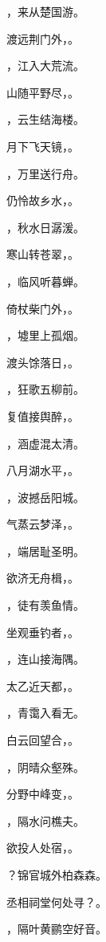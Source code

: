 \documentclass[12pt, a4paper, addpoints]{exam}
\begin{document}
\begin{questions}
\question[3] \fillin，来从楚国游。

\question[3] 渡远荆门外，\fillin。

\question[3] \fillin，江入大荒流。

\question[3] 山随平野尽，\fillin。

\question[3] \fillin，云生结海楼。

\question[3] 月下飞天镜，\fillin。

\question[3] \fillin，万里送行舟。

\question[3] 仍怜故乡水，\fillin。

\question[3] \fillin，秋水日潺湲。

\question[3] 寒山转苍翠，\fillin。

\question[3] \fillin，临风听暮蝉。

\question[3] 倚杖柴门外，\fillin。

\question[3] \fillin，墟里上孤烟。

\question[3] 渡头馀落日，\fillin。

\question[3] \fillin，狂歌五柳前。

\question[3] 复值接舆醉，\fillin。

\question[3] \fillin，涵虚混太清。

\question[3] 八月湖水平，\fillin。

\question[3] \fillin，波撼岳阳城。

\question[3] 气蒸云梦泽，\fillin。

\question[3] \fillin，端居耻圣明。

\question[3] 欲济无舟楫，\fillin。

\question[3] \fillin，徒有羡鱼情。

\question[3] 坐观垂钓者，\fillin。

\question[3] \fillin，连山接海隅。

\question[3] 太乙近天都，\fillin。

\question[3] \fillin，青霭入看无。

\question[3] 白云回望合，\fillin。

\question[3] \fillin，阴晴众壑殊。

\question[3] 分野中峰变，\fillin。

\question[3] \fillin，隔水问樵夫。

\question[3] 欲投人处宿，\fillin。

\question[3] \fillin？锦官城外柏森森。

\question[3] 丞相祠堂何处寻？\fillin。

\question[3] \fillin，隔叶黄鹂空好音。


\end{questions}
\end{document}
